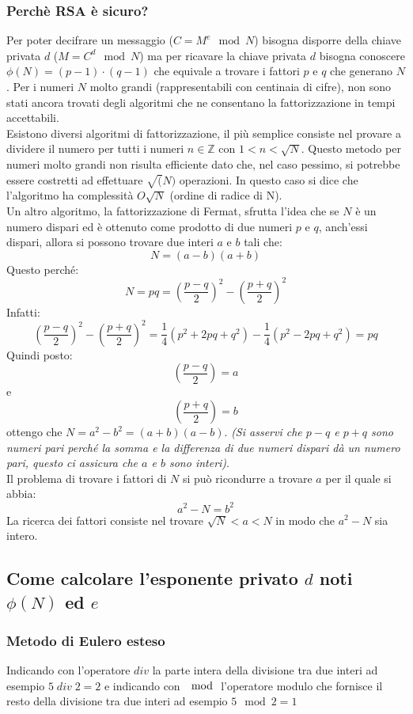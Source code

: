 \documentclass[14pt,a4paper]{article}
\begin{document}
	\subsubsection{Perchè RSA è sicuro?}
	Per poter decifrare un messaggio ($ C=M^e \mod N $) bisogna disporre della  chiave privata $ d $ ($ M=C^d \mod N $) ma per ricavare la chiave privata $ d $ bisogna conoscere $ \phi(N)=(p-1)\cdot (q-1) $ che equivale a trovare i fattori  $ p $ e $ q $  che generano $ N $. Per i numeri $ N $ molto grandi (rappresentabili con centinaia di cifre), non sono stati ancora trovati  degli algoritmi che ne consentano la fattorizzazione in tempi accettabili.\\ Esistono diversi algoritmi di fattorizzazione, il più semplice consiste nel provare a dividere il numero per tutti i numeri $ n \in \mathbb{Z}$ con $ 1<n<\sqrt{N} $. Questo metodo per numeri molto grandi non risulta efficiente dato che, nel caso pessimo, si potrebbe essere costretti ad effettuare $ \sqrt(N) $ operazioni. In questo caso si dice che l'algoritmo ha complessità $ O\sqrt{N} $ (ordine di radice di N). \\
	Un altro algoritmo, la fattorizzazione di Fermat, sfrutta l'idea che se $ N $ è un numero dispari ed è ottenuto come prodotto di due numeri $ p $ e $ q $,  anch'essi dispari, allora si possono trovare due interi $ a $ e $ b $ tali che:\[ N=(a-b)(a+b) \] 
	Questo perché:\[ N=p q=\left(\frac{p-q}{2}\right)  ^2-\left( \frac{p+q}{2}\right) ^2 \] 
	Infatti:\[ \left(\frac{p-q}{2}\right)  ^2-\left( \frac{p+q}{2}\right) ^2=\frac{1}{4}(p^2+2pq+q^2)-\frac{1}{4}(p^2-2pq+q^2)=pq \]
	Quindi posto:
	\[ \left(\frac{p-q}{2}\right)=a \]
	e
	\[ \left( \frac{p+q}{2}\right)=b \]
	ottengo che $ N=a^2-b^2=(a+b)(a-b) $. \textit{(Si asservi che $ p-q $ e $ p+q $ sono numeri pari perché la somma e la differenza di due numeri dispari dà un numero pari, questo ci assicura che $ a $ e $ b $ sono interi)}.\\ 
	Il problema di trovare i fattori di $ N $ si può ricondurre a trovare $ a $ per il quale si abbia:\[ a^2-N=b^2 \] 
	La ricerca dei fattori consiste nel trovare $ \sqrt{N}<a<N $ in modo che $ a^2-N $ sia intero.
	\subsection{Come calcolare l'esponente privato $ d $ noti $ \phi(N) $ ed $ e $}
	\subsubsection{Metodo di Eulero esteso}
	Indicando con l'operatore $ div $ la  parte intera della divisione  tra due interi ad esempio $ 5\; div\; 2 =2$  e indicando con $ \mod $ l'operatore modulo che fornisce il resto della divisione tra due interi ad esempio $ 5 \mod 2 =1 $
	
\end{document}
